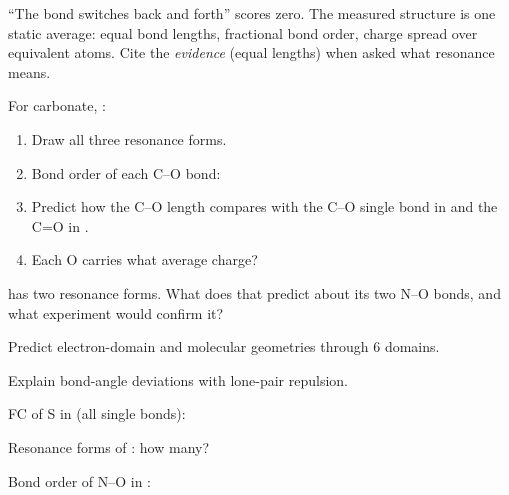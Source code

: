 \documentclass{apchem-notes}
\begin{document}
\begin{apctrap}
``The bond switches back and forth'' scores zero. The measured structure is
one static average: equal bond lengths, fractional bond order, charge spread
over equivalent atoms. Cite the \emph{evidence} (equal lengths) when asked
what resonance means.
\end{apctrap}


For carbonate, :
\begin{enumerate}[leftmargin=*,itemsep=0.4em]
  \item Draw all three resonance forms. \workspace[3.6cm]
  \item Bond order of each C--O bond: 
  \item Predict how the C--O length compares with the C--O single bond in
         and the C=O in .
  \item Each O carries what average charge? 
\end{enumerate}

\begin{exitticket}
 has two resonance forms. What does that predict about its two N--O
bonds, and what experiment would confirm it? 
\end{exitticket}


\begin{objectives}
  \item Predict electron-domain and molecular geometries through 6 domains.
  \item Explain bond-angle deviations with lone-pair repulsion.
\end{objectives}


\begin{warmup}[3]
  \item FC of S in  (all single bonds):
  \item Resonance forms of : how many?
  \item Bond order of N--O in : 
\end{warmup}
\end{document}

